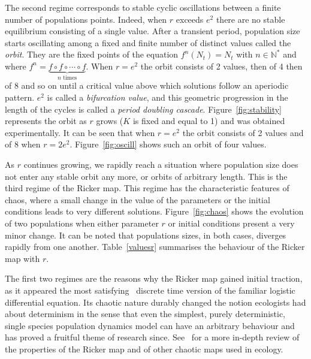 \documentclass[12pt]{article}
\begin{document}
	The second regime corresponds to stable cyclic oscillations between a finite number of populations points. Indeed, when $r$ exceeds $e^2$ there are no stable equilibrium consisting of a single value. After a transient period, population size starts oscillating among a fixed and finite number of distinct values called the \emph{orbit}. They are the fixed points of the equation $f^n(N_t) = N_t$ with $n \in \mathbb{N^*}$ and where $f^n = \underbrace{f\circ f\circ \cdots \circ f}_{n\text{\ times}}$. When $r=e^2$ the orbit consists of 2 values, then of 4 then of 8 and so on until a critical value above which solutions follow an aperiodic pattern. $e^2$ is called a \emph{bifurcation value}, and this geometric progression in the length of the cycles is called a \emph{period doubling cascade}. Figure~\ref{fig:stability} represents the orbit as $r$ grows ($K$ is fixed and equal to 1) and was obtained experimentally. It can be seen that when $r=e^2$ the orbit consists of 2 values and of 8 when $r=2e^2$. Figure~\ref{fig:oscill} shows such an orbit of four values.
	
	As $r$ continues growing, we rapidly reach a situation where population size does not enter any stable orbit any more, or orbits of arbitrary length. This is the third regime of the Ricker map. This regime has the characteristic features of chaos, where a small change in the value of the parameters or the initial conditions leads to very different solutions. Figure~\ref{fig:chaos} shows the evolution of two populations when either parameter $r$ or initial conditions present a very minor change. It can be noted that populations sizes, in both cases, diverges rapidly from one another. Table~\ref{valuesr} summarises the behaviour of the Ricker map with $r$.
	
	The first two regimes are the reasons why the Ricker map gained initial traction, as it appeared the most satisfying~\cite{cook1965oscillation} discrete time version of the familiar logistic differential equation. Its chaotic nature durably changed the notion ecologists had about determinism in the sense that even the simplest, purely deterministic, single species population dynamics model can have an arbitrary behaviour and has proved a fruitful theme of research since. See~\cite{may1975biological} for a more in-depth review of the properties of the Ricker map and of other chaotic maps used in ecology. 
	
\end{document}
